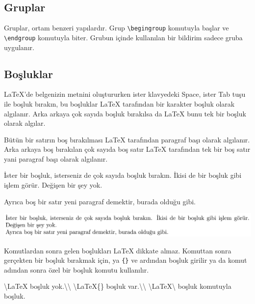 \documentclass[
  10pt,
]{scrbook}
\newenvironment{Shaded}{}{}
\newcommand{\FunctionTok}[1]{\textcolor[rgb]{0.02,0.16,0.49}{#1}}
\newcommand{\NormalTok}[1]{#1}
\theoremstyle{definition}
\theoremstyle{definition}
\theoremstyle{definition}
\theoremstyle{definition}
\theoremstyle{remark}
\begin{document}
\hypertarget{gruplar}{%
\subsection{Gruplar}\label{gruplar}}

Gruplar, ortam benzeri yapılardır. Grup \texttt{\textbackslash{}begingroup} komutuyla başlar ve \texttt{\textbackslash{}endgroup} komutuyla biter. Grubun içinde kullanılan bir bildirim sadece gruba uygulanır.

\hypertarget{bosluk}{%
\subsection{Boşluklar}\label{bosluk}}

LaTeX'de belgenizin metnini oluştururken ister klavyedeki Space, ister Tab tuşu ile boşluk bırakın, bu boşluklar LaTeX tarafından bir karakter boşluk olarak algılanır. Arka arkaya çok sayıda boşluk bırakılsa da LaTeX bunu tek bir boşluk olarak algılar.

Bütün bir satırın boş bırakılması LaTeX tarafından paragraf başı olarak algılanır. Arka arkaya boş bırakılan çok sayıda boş satır LaTeX tarafından tek bir boş satır yani paragraf başı olarak algılanır.

\begin{Shaded}
\begin{Highlighting}[]
\NormalTok{ İster bir boşluk, isterseniz de çok         sayıda boşluk bırakın.}
\NormalTok{İkisi de bir boşluk gibi işlem görür. Değişen bir şey yok.}

\NormalTok{Ayrıca boş bir satır yeni paragraf demektir, burada olduğu gibi.}
\end{Highlighting}
\end{Shaded}

\insvg

\includegraphics[width=1\textwidth,height=\textheight]{examples/ex1.svg} \outsvg

Komutlardan sonra gelen boşlukları LaTeX dikkate almaz. Komuttan sonra gerçekten bir boşluk bırakmak için, ya \texttt{\{\}} ve ardından boşluk girilir ya da komut adından sonra özel bir boşluk komutu kullanılır.

\begin{Shaded}
\begin{Highlighting}[]
\FunctionTok{\textbackslash{}LaTeX}\NormalTok{  boşluk yok.}\FunctionTok{\textbackslash{}\textbackslash{}}
\FunctionTok{\textbackslash{}LaTeX}\NormalTok{\{\} boşluk var.}\FunctionTok{\textbackslash{}\textbackslash{}}
\FunctionTok{\textbackslash{}LaTeX\textbackslash{} }\NormalTok{boşluk komutuyla  boşluk.}
\end{Highlighting}
\end{Shaded}
\end{document}
